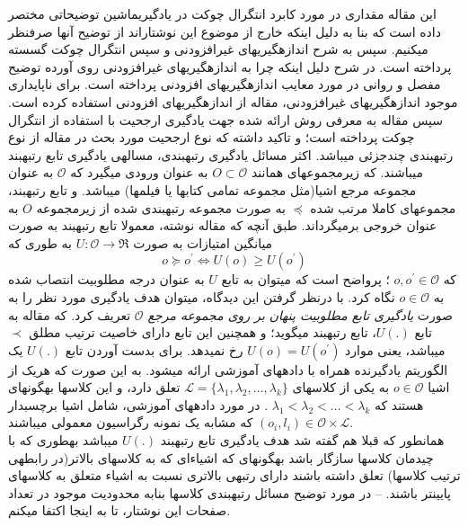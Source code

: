 \documentclass[10pt,a4paper]{article}
\newcommand{\نیمفاصله}{\halfspace}
\renewcommand{\ }{\halfspace}
\renewcommand{\O}{\mathscr{O}}
\renewcommand{\L}{\mathscr{L}}
\begin{document}
این مقاله مقداری در مورد کابرد انتگرال چوکت در یادگیری\ ماشین توضیحاتی مختصر داده است که بنا به دلیل اینکه خارج از موضوع این نوشتاراند از توضیح آنها صرف\ نظر می\ کنیم. سپس به شرح اندازه\ گیری\ های غیرافزودنی و سپس انتگرال چوکت گسسته پرداخته است. در شرح دلیل اینکه چرا به اندازه\ گیری\ های غیرافزودنی روی آورده توضیح مفصل و روانی در مورد معایب اندازه\ گیری\ های افزودنی پرداخته است. برای ناپایداری موجود اندازه\ گیری\ های غیرافزودنی، مقاله از اندازه\ گیری\ های افزودنی استفاده کرده است.
سپس مقاله به معرفی روش ارائه شده جهت یادگیری ارجحیت با استفاده از انتگرال چوکت پرداخته است؛ و تاکید داشته که نوع ارجحیت مورد بحث در مقاله از نوع رتبه\ بندی چندجزئی می\ باشد. اکثر مسائل یادگیری رتبه\ بندی، مساله\ ی یادگیری تابع رتبه\ بند می\ باشند. که زیرمجموعه\ ای همانند
$O \subset \O$
به عنوان ورودی می\ گیرد که
$\O$
به عنوان مجموعه مرجع اشیا(مثل مجموعه تمامی کتاب\ ها یا فیلم\ ها) می\ باشد. و تابع رتبه\ بند، مجموعه\ ای کاملا مرتب شده
$\preceq$
به صورت مجموعه رتبه\ بندی شده از زیرمجموعه $O$ به عنوان خروجی برمی\ گرداند. طبق آنچه که مقاله نوشته، معمولا تابع رتبه\ بند به صورت میانگین امتیازات به صورت
$U: \O \rightarrow \Re$
به طوری که
\[o \succeq o^\prime \Leftrightarrow U(o) \geq U(o^\prime)\]
که
$o, o^\prime \in \O$
؛ پرواضح است که می\ توان به تابع $U$ به عنوان درجه مطلوبیت انتصاب شده به
$o \in \O$
نگاه کرد. با درنظر گرفتن این دیدگاه، می\ توان هدف یادگیری مورد نظر را به صورت
\textit{یادگیری تابع مطلوبیت پنهان بر روی مجموعه مرجع $\O$}
تعریف کرد. که مقاله به تابع
$U(.)$\
، تابع رتبه\ بند می\ گوید؛ و همچنین این تابع دارای خاصیت ترتیب مطلق
$\prec$
می\ باشد، یعنی موارد
$U(o) = U(o^\prime)$
رخ نمی\ دهد. برای بدست آوردن تابع
$U(.)$
یک الگوریتم یادگیرنده همراه با داده\ های آموزشی ارائه می\ شود. به این صورت که هریک از اشیا
$o \in \O$
به یکی از کلاس\ های
$\L = \lbrace \lambda_1, \lambda_2, \ldots, \lambda_k \rbrace$
تعلق دارد، و این کلاس\ ها به\ گونه\ ای هستند که
$\lambda_1 < \lambda_2 < \ldots < \lambda_k$
. در مورد داده\ های آموزشی، شامل اشیا برچسب\ دار
$(o_i, l_i) \in \O \times \L$
که مشابه یک نمونه رگراسیون معمولی می\ باشند.\\
همانطور که قبلا هم گفته شد هدف یادگیری تابع رتبه
$U(.)$
می\ باشد به\ طوری که با چیدمان کلاس\ ها سازگار باشد به\ گونه\ ای که اشیاءای که به کلاس\ های بالاتر(در رابطه\ ی ترتیب کلاس\ ها) تعلق داشته باشند دارای رتبه\ ی بالاتری نسبت به اشیاء متعلق به کلاس\ های پایین\ تر باشند. -- در مورد توضیح مسائل رتبه\ بندی کلاس\ ها بنابه محدودیت موجود در تعداد صفحات این نوشتار، تا به اینجا اکتفا می\ کنم.\بند
\end{document}
